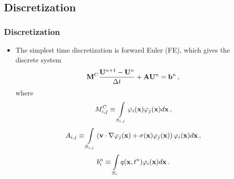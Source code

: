 \documentclass{beamer} \useoutertheme{infolines}
\begin{document}
\subsection{Discretization}
\begin{frame}
\frametitle{Discretization}

\begin{itemize}
   \item The simplest time discretization is forward Euler (FE), which gives the
      discrete system
   \begin{equation}
      \consistentmassmatrix\frac{\solutionvector^{n+1}-\solutionvector^n}
        {\dt} + \ssmatrix\solutionvector^n = \ssrhs^n \eqc
   \end{equation}
   where
   \begin{equation}
     M_{i,j}^C \equiv \int\limits_{S_{i,j}}
       \varphi_i(\mathbf{x}) \varphi_j(\mathbf{x}) d\mathbf{x} \,,
   \end{equation}
   \begin{equation}
     A_{i,j} \equiv \int\limits_{S_{i,j}}\left(
       \mathbf{v}\cdot\nabla\varphi_j(\mathbf{x}) +
		\sigma(\mathbf{x})\varphi_j(\mathbf{x})\right)\varphi_i(\mathbf{x}) d\mathbf{x} \,,
   \end{equation}
   \begin{equation}
      b_i^n \equiv \int\limits_{S_i} q(\mathbf{x},t^n)\varphi_i(\mathbf{x}) d\mathbf{x} \,.
   \end{equation}
\end{itemize}

\end{frame}
\end{document}
